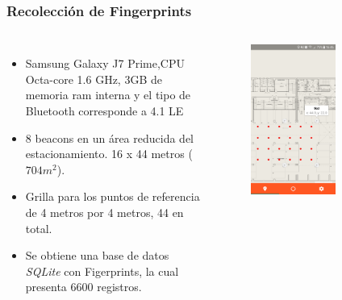\documentclass[handout]{beamer}
\begin{document}

\begin{frame}
\frametitle{Recolección de Fingerprints}

\begin{columns}[t] %


\begin{itemize}
\item Samsung Galaxy J7 Prime,CPU Octa-core 1.6 GHz, 3GB de memoria ram interna y el tipo de Bluetooth corresponde a 4.1 LE

\item 8 beacons en un área reducida del estacionamiento. 16 x 44 metros ($704m^2$).

\item Grilla para los puntos de referencia de 4 metros por 4 metros, 44 en total.

\item Se obtiene una base de datos \textit{SQLite} con Figerprints, la cual presenta 6600 registros.
\end{itemize}

\begin{figure}
\includegraphics[width=0.65\textwidth]{../figures/deployBeacons.png}
\end{figure}

\end{columns}

\end{frame}
\end{document}
